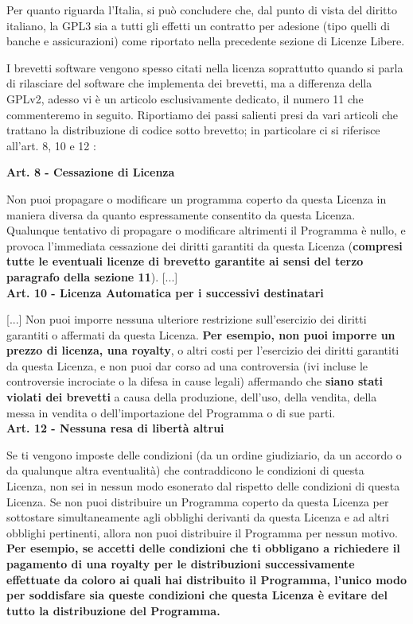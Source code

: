 Per quanto riguarda l'Italia, si può concludere che, dal punto di vista del diritto italiano, la GPL3 sia a tutti gli effetti un contratto per adesione (tipo quelli di banche e assicurazioni) come riportato nella precedente sezione di Licenze Libere.

I brevetti software vengono spesso citati nella licenza soprattutto quando si parla di rilasciare del software che implementa dei brevetti, ma a differenza della GPLv2, adesso vi è un articolo esclusivamente dedicato, il numero 11 che commenteremo in seguito. Riportiamo dei passi salienti presi da vari articoli che trattano la distribuzione di codice sotto brevetto; in particolare ci si riferisce all'art. 8, 10 e 12 :\\


\begin{scriptsize}
\textbf{Art. 8 - Cessazione di Licenza}

Non puoi propagare o modificare un programma coperto da questa Licenza in maniera diversa da quanto espressamente consentito da questa Licenza. Qualunque tentativo di propagare o modificare altrimenti il Programma è nullo, e provoca l'immediata cessazione dei diritti garantiti da questa Licenza (\textbf{compresi tutte le eventuali licenze di brevetto garantite ai sensi del terzo paragrafo della sezione 11}).
[...]\\

\textbf{Art. 10 - Licenza Automatica per i successivi destinatari}

[...]
Non puoi imporre nessuna ulteriore restrizione sull'esercizio dei diritti garantiti o affermati da questa Licenza. \textbf{Per esempio, non puoi imporre un prezzo di licenza, una royalty}, o altri costi per l'esercizio dei diritti garantiti da questa Licenza, e non puoi dar corso ad una controversia (ivi incluse le controversie incrociate o la difesa in cause legali) affermando che \textbf{siano stati violati dei brevetti} a causa della produzione, dell'uso, della vendita, della messa in vendita o dell'importazione del Programma o di sue parti.\\

\textbf{Art. 12 - Nessuna resa di libertà altrui}


Se ti vengono imposte delle condizioni (da un ordine giudiziario, da un accordo o da qualunque altra eventualità) che contraddicono le condizioni di questa Licenza, non sei in nessun modo esonerato dal rispetto delle condizioni di questa Licenza. Se non puoi distribuire un Programma coperto da questa Licenza per sottostare simultaneamente agli obblighi derivanti da questa Licenza e ad altri obblighi pertinenti, allora non puoi distribuire il Programma per nessun motivo. \textbf{Per esempio, se accetti delle condizioni che ti obbligano a richiedere il pagamento di una royalty per le distribuzioni successivamente effettuate da coloro ai quali hai distribuito il Programma, l'unico modo per soddisfare sia queste condizioni che questa Licenza è evitare del tutto la distribuzione del Programma.}\\


\end{scriptsize}


